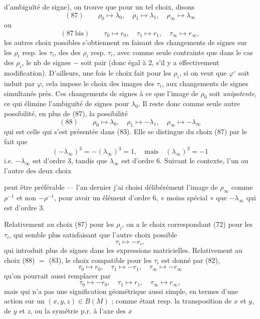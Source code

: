 \documentclass[11pt,a4paper]{article}
\begin{document}
d'ambiguïté de signe), on trouve que pour un tel choix, disons
\[
(87)\qquad \rho_0 \longmapsto \lambda_0, \quad \rho_1 \longmapsto \lambda_1, \quad \rho_\infty \longmapsto \lambda_\infty
\]
ou
\[
(87\ \text{bis})\qquad \tau_0 \longmapsto r_0, \quad \tau_1 \longmapsto r_1, \quad \tau_\infty \longmapsto r_\infty ,
\]
les autres choix possibles s'obtiennent en faisant des changements de signes sur les $\rho_i$ resp. les $\tau_i$, \ill{} des  des $\rho_i$ resp. $\tau_i$, avec comme seule contrainte que dans le cas des $\rho_i$, le nb de signes $-$ soit pair (donc égal à $2$, s'il y a effectivement modification). D'ailleurs, une fois le choix fait pour les $\rho_i$, si on veut que $\varphi^{\circ}$ soit induit par $\varphi$, cela impose le choix des images des $\tau_i$, aux changements de signes simultanés près. Ces changements de signes  à ce que l'image de $\rho_0$ soit  \struck{\ill{}} \emph{unipotente}, ce qui élimine l'ambiguïté de signes pour $\lambda_0$.  Il reste donc comme seule autre possibilité, en plus de (87), la possibilité
\[
(88)\qquad \rho_0 \longmapsto \lambda_0, \quad \rho_1 \longmapsto -\lambda_1, \quad \rho_\infty \longmapsto -\lambda_\infty
\]
qui est celle qui s'est présentée dans (83). Elle se distingue du choix (87) par le fait que
\[
(-\lambda_\infty)^3 = -(\lambda_\infty)^3 = 1, \quad \text{mais} \quad (\lambda_\infty)^3 = -1
\]
i.e. $-\lambda_\infty$ est d'ordre $3$, tandis que $\lambda_\infty$ est d'ordre $6$. Suivant le contexte, l'un ou l'autre des deux choix


peut être préférable --- l'an dernier j'ai choisi délibérément l'image de $\rho_\infty$ comme \add{$\lambda_\infty =$} $\rho^{-1}$ et non $-\rho^{-1}$, pour avoir un élément d'ordre $6$, « moins spécial » que $-\lambda_\infty$ qui est d'ordre $3$.

Relativement au choix (87)  pour les $\rho_i$, on a le choix correspondant  (72) pour les $\tau_i$, qui semble plus satisfaisant que l'autre choix possible
\[
\tau_i \longmapsto -r_i ,
\]
qui introduit plus de signes dans les expressions matricielles. Relativement au choix (88) $=$ (83), le choix compatible pour les $\tau_i$ est donné par (82), 
\[
\tau_0 \longmapsto r_0, \quad \tau_1 \longmapsto -r_1, \quad \tau_\infty \longmapsto -r_\infty
\]
qu'on pourrait aussi remplacer par
\[
\tau_0 \longmapsto -r_0, \quad \tau_1 \longmapsto r_1, \quad \tau_\infty \longmapsto r_\infty ,
\]
mais qui n'a pas une signification géométrique aussi simple, en termes d'une action sur un $(x,y,z) \in B(M)$ ; comme étant resp. la transposition de $x$ et $y$, de $y$ et $z$, ou la symétrie p.r. à l'axe des $x$
\end{document}
